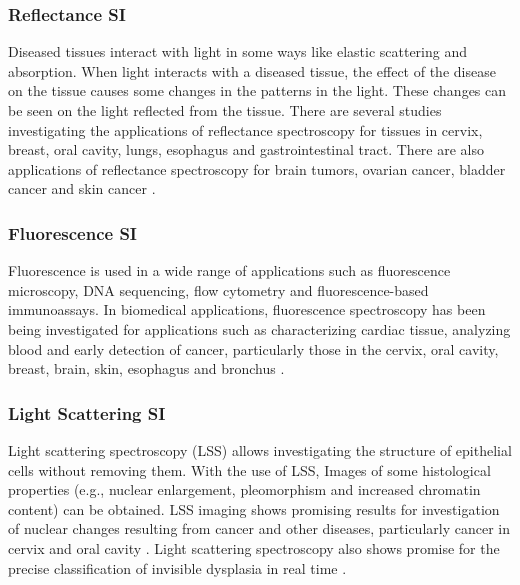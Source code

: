 \documentclass[a4paper]{article}
\begin{document}
           \subsubsection{Reflectance SI}
           \hspace{5mm} Diseased tissues interact with light in some ways like elastic scattering and absorption. When light interacts with a diseased tissue, the effect of the disease on the tissue causes some changes in the patterns in the light. These changes can be seen on the light reflected from the tissue. There are several studies investigating the applications of reflectance spectroscopy for tissues in cervix, breast, oral cavity, lungs, esophagus and gastrointestinal tract. There are also applications of reflectance spectroscopy for brain tumors, ovarian cancer, bladder cancer and skin cancer \cite{onbes}. 
          
            \subsubsection{Fluorescence SI}
            \hspace{5mm} Fluorescence is used in a wide range of applications such as fluorescence microscopy, DNA sequencing, flow cytometry and fluorescence-based immunoassays. In biomedical applications, fluorescence spectroscopy has been being investigated for applications such as characterizing cardiac tissue, analyzing blood and early detection of cancer, particularly those in the cervix, oral cavity, breast, brain, skin, esophagus and bronchus \cite{onalti}.

            \subsubsection{Light Scattering SI}
            \hspace{5mm} Light scattering spectroscopy (LSS) allows investigating the structure of epithelial cells without removing them. With the use of LSS, Images of some histological properties (e.g., nuclear enlargement, pleomorphism and increased chromatin content) can be obtained. LSS imaging shows promising results for investigation of nuclear changes resulting from cancer and other diseases, particularly cancer in cervix and oral cavity \cite{onalti.1}. Light scattering spectroscopy also shows promise for the precise classification of invisible dysplasia in real time \cite{onalti.2}.
\end{document}
